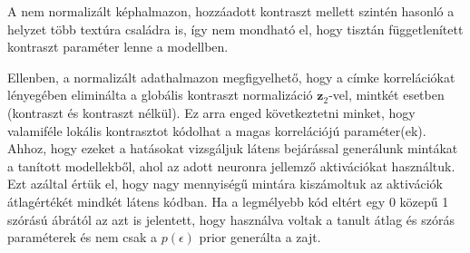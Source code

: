 \documentclass[12pt, english]{article}
\begin{document}
\par A nem normalizált képhalmazon, hozzáadott kontraszt mellett szintén hasonló a helyzet több textúra családra is, így nem mondható el, hogy tisztán függetlenített kontraszt paraméter lenne a modellben.

\vspace{4mm}

\par Ellenben, a normalizált adathalmazon megfigyelhető, hogy a címke korrelációkat lényegében eliminálta a globális kontraszt normalizáció $\bm{z}_{2}$-vel, mintkét esetben (kontraszt és kontraszt nélkül). Ez arra enged következtetni minket, hogy valamiféle lokális kontrasztot kódolhat a magas korrelációjú paraméter(ek). Ahhoz, hogy ezeket a hatásokat vizsgáljuk látens bejárással generálunk mintákat a tanított modellekből, ahol az adott neuronra jellemző aktivációkat használtuk. Ezt azáltal értük el, hogy nagy mennyiségű mintára kiszámoltuk az aktivációk átlagértékét mindkét látens kódban. Ha a legmélyebb kód eltért egy 0 közepű 1 szórású ábrától az azt is jelentett, hogy használva voltak a tanult átlag és szórás paraméterek és nem csak a $p(\epsilon)$ prior generálta a zajt. 

\vspace{4mm}
\end{document}

